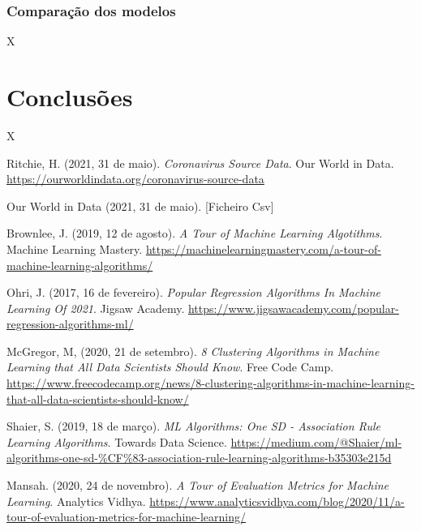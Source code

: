 \documentclass[conference]{IEEEtran}
\begin{document}
\subsubsection{Comparação dos modelos}
X



\section{Conclusões} %
X

\begin{thebibliography}{00}

 Ritchie, H. (2021, 31 de maio). \textit{Coronavirus Source Data}. Our World in Data. \url{https://ourworldindata.org/coronavirus-source-data}

 Our World in Data (2021, 31 de maio). [Ficheiro Csv]

 Brownlee, J. (2019, 12 de agosto). \textit{A Tour of Machine Learning Algotithms}. Machine Learning Mastery. \url{https://machinelearningmastery.com/a-tour-of-machine-learning-algorithms/}

 Ohri, J. (2017, 16 de fevereiro). \textit{Popular Regression Algorithms In Machine Learning Of 2021}. Jigsaw Academy. \url{https://www.jigsawacademy.com/popular-regression-algorithms-ml/}

 McGregor, M, (2020, 21 de setembro). \textit{8 Clustering Algorithms in Machine Learning that All Data Scientists Should Know}. Free Code Camp. \url{https://www.freecodecamp.org/news/8-clustering-algorithms-in-machine-learning-that-all-data-scientists-should-know/ }

 Shaier, S. (2019, 18 de março). \textit{ML Algorithms: One SD - Association Rule Learning Algorithms}. Towards Data Science. \url{https://medium.com/@Shaier/ml-algorithms-one-sd-%CF%83-association-rule-learning-algorithms-b35303e215d}

 Mansah. (2020, 24 de novembro). \textit{A Tour of Evaluation Metrics for Machine Learning}. Analytics Vidhya. \url{https://www.analyticsvidhya.com/blog/2020/11/a-tour-of-evaluation-metrics-for-machine-learning/}

\end{thebibliography}
\end{document}
